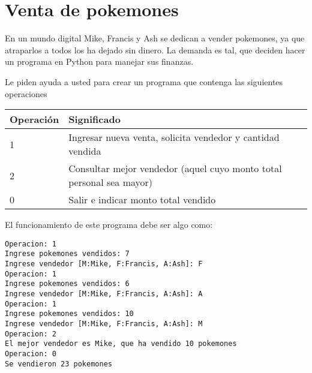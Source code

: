 \section{Venta de pokemones}
En un mundo digital Mike, Francis y Ash se dedican a vender pokemones, ya que atraparlos a todos los ha dejado sin dinero. La demanda es tal, que deciden hacer un programa en Python para manejar sus finanzas.

Le piden ayuda a usted para crear un programa que contenga las siguientes operaciones

\begin{table}[htbp]
\begin{center}
\begin{tabular}{|l|l|}
\hline
Operación & Significado \\
\hline \hline
1 & Ingresar nueva venta, solicita vendedor y cantidad vendida \\ \hline
2 & Consultar mejor vendedor (aquel cuyo monto total personal sea mayor) \\ \hline
0 & Salir e indicar monto total vendido \\ \hline
\end{tabular}
\end{center}
\end{table}

El funcionamiento de este programa debe ser algo como:
\begin{lstlisting}[style=consola]
Operacion: 1
Ingrese pokemones vendidos: 7
Ingrese vendedor [M:Mike, F:Francis, A:Ash]: F
Operacion: 1
Ingrese pokemones vendidos: 6
Ingrese vendedor [M:Mike, F:Francis, A:Ash]: A
Operacion: 1
Ingrese pokemones vendidos: 10
Ingrese vendedor [M:Mike, F:Francis, A:Ash]: M
Operacion: 2
El mejor vendedor es Mike, que ha vendido 10 pokemones
Operacion: 0
Se vendieron 23 pokemones
\end{lstlisting}